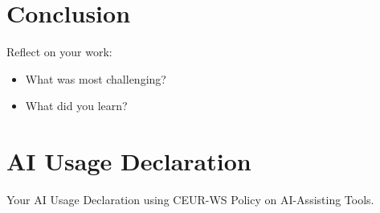 \documentclass[11pt]{article}
\begin{document}
\section{Conclusion}
Reflect on your work:
\begin{itemize}
    \item What was most challenging?
    \item What did you learn?
\end{itemize}

\section{AI Usage Declaration}

Your AI Usage Declaration using CEUR-WS Policy on AI-Assisting Tools.
\end{document}
